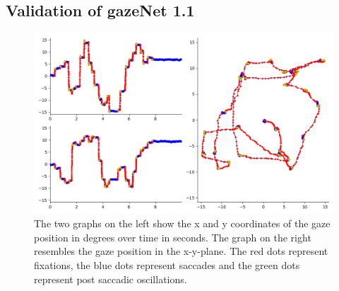 \documentclass[conference]{IEEEtran}
\begin{document}
\subsection{Validation of gazeNet 1.1}
\begin{figure}[ht]
    \includegraphics[width=\linewidth]{TH34_img_Europe_labelled_MN}
    \caption{The two graphs on the left show the x and y coordinates of the gaze position in degrees over time in seconds. The graph on the right resembles the gaze position in the x-y-plane. The red dots represent fixations, the blue dots represent saccades and the green dots represent post saccadic oscillations.}
\end{figure}



\end{document}
